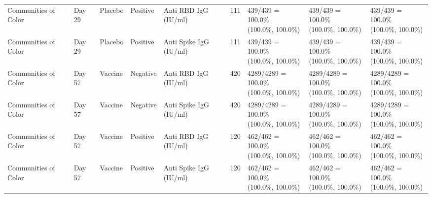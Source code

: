 \documentclass[]{book}
\theoremstyle{definition}
\theoremstyle{definition}
\theoremstyle{definition}
\newcommand{\1}{\mathbbm{1}}
\begin{document}
\begin{landscape}
\begin{ThreePartTable}
\begin{longtable}[t]{>{\raggedright\arraybackslash}p{2.7cm}llllllll}
\hspace{1em}Communities of Color & Day 29 & Placebo & Positive & Anti RBD IgG (IU/ml) & 111 & \makecell[l]{439/439 = 100.0\%\\(100.0\%, 100.0\%)} & \makecell[l]{439/439 = 100.0\%\\(100.0\%, 100.0\%)} & \makecell[l]{439/439 = 100.0\%\\(100.0\%, 100.0\%)}\\
\hspace{1em}Communities of Color & Day 29 & Placebo & Positive & Anti Spike IgG (IU/ml) & 111 & \makecell[l]{439/439 = 100.0\%\\(100.0\%, 100.0\%)} & \makecell[l]{439/439 = 100.0\%\\(100.0\%, 100.0\%)} & \makecell[l]{439/439 = 100.0\%\\(100.0\%, 100.0\%)}\\
\hspace{1em}Communities of Color & Day 57 & Vaccine & Negative & Anti RBD IgG (IU/ml) & 420 & \makecell[l]{4289/4289 = 100.0\%\\(100.0\%, 100.0\%)} & \makecell[l]{4289/4289 = 100.0\%\\(100.0\%, 100.0\%)} & \makecell[l]{4289/4289 = 100.0\%\\(100.0\%, 100.0\%)}\\
\hspace{1em}Communities of Color & Day 57 & Vaccine & Negative & Anti Spike IgG (IU/ml) & 420 & \makecell[l]{4289/4289 = 100.0\%\\(100.0\%, 100.0\%)} & \makecell[l]{4289/4289 = 100.0\%\\(100.0\%, 100.0\%)} & \makecell[l]{4289/4289 = 100.0\%\\(100.0\%, 100.0\%)}\\
\hspace{1em}Communities of Color & Day 57 & Vaccine & Positive & Anti RBD IgG (IU/ml) & 120 & \makecell[l]{462/462 = 100.0\%\\(100.0\%, 100.0\%)} & \makecell[l]{462/462 = 100.0\%\\(100.0\%, 100.0\%)} & \makecell[l]{462/462 = 100.0\%\\(100.0\%, 100.0\%)}\\
\hspace{1em}Communities of Color & Day 57 & Vaccine & Positive & Anti Spike IgG (IU/ml) & 120 & \makecell[l]{462/462 = 100.0\%\\(100.0\%, 100.0\%)} & \makecell[l]{462/462 = 100.0\%\\(100.0\%, 100.0\%)} & \makecell[l]{462/462 = 100.0\%\\(100.0\%, 100.0\%)}\\

\end{longtable}
\end{ThreePartTable}
\end{landscape}
\end{document}
